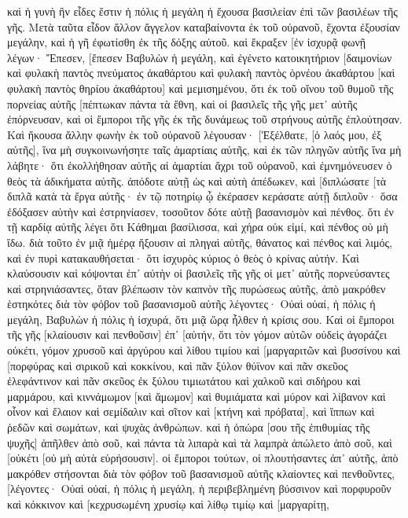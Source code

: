καὶ ἡ γυνὴ ἣν εἶδες ἔστιν ἡ πόλις ἡ μεγάλη ἡ ἔχουσα βασιλείαν ἐπὶ τῶν βασιλέων τῆς γῆς. 
Μετὰ ταῦτα εἶδον ἄλλον ἄγγελον καταβαίνοντα ἐκ τοῦ οὐρανοῦ, ἔχοντα ἐξουσίαν μεγάλην, καὶ ἡ γῆ ἐφωτίσθη ἐκ τῆς δόξης αὐτοῦ. 
καὶ ἔκραξεν [ἐν ἰσχυρᾷ φωνῇ λέγων· Ἔπεσεν, [ἔπεσεν Βαβυλὼν ἡ μεγάλη, καὶ ἐγένετο κατοικητήριον [δαιμονίων καὶ φυλακὴ παντὸς πνεύματος ἀκαθάρτου καὶ φυλακὴ παντὸς ὀρνέου ἀκαθάρτου [καὶ φυλακὴ παντὸς θηρίου ἀκαθάρτου] καὶ μεμισημένου, 
ὅτι ἐκ τοῦ οἴνου τοῦ θυμοῦ τῆς πορνείας αὐτῆς [πέπτωκαν πάντα τὰ ἔθνη, καὶ οἱ βασιλεῖς τῆς γῆς μετ᾽ αὐτῆς ἐπόρνευσαν, καὶ οἱ ἔμποροι τῆς γῆς ἐκ τῆς δυνάμεως τοῦ στρήνους αὐτῆς ἐπλούτησαν. 
Καὶ ἤκουσα ἄλλην φωνὴν ἐκ τοῦ οὐρανοῦ λέγουσαν· [Ἐξέλθατε, [ὁ λαός μου, ἐξ αὐτῆς], ἵνα μὴ συγκοινωνήσητε ταῖς ἁμαρτίαις αὐτῆς, καὶ ἐκ τῶν πληγῶν αὐτῆς ἵνα μὴ λάβητε· 
ὅτι ἐκολλήθησαν αὐτῆς αἱ ἁμαρτίαι ἄχρι τοῦ οὐρανοῦ, καὶ ἐμνημόνευσεν ὁ θεὸς τὰ ἀδικήματα αὐτῆς. 
ἀπόδοτε αὐτῇ ὡς καὶ αὐτὴ ἀπέδωκεν, καὶ [διπλώσατε [τὰ διπλᾶ κατὰ τὰ ἔργα αὐτῆς· ἐν τῷ ποτηρίῳ ᾧ ἐκέρασεν κεράσατε αὐτῇ διπλοῦν· 
ὅσα ἐδόξασεν αὑτὴν καὶ ἐστρηνίασεν, τοσοῦτον δότε αὐτῇ βασανισμὸν καὶ πένθος. ὅτι ἐν τῇ καρδίᾳ αὐτῆς λέγει ὅτι Κάθημαι βασίλισσα, καὶ χήρα οὐκ εἰμί, καὶ πένθος οὐ μὴ ἴδω. 
διὰ τοῦτο ἐν μιᾷ ἡμέρᾳ ἥξουσιν αἱ πληγαὶ αὐτῆς, θάνατος καὶ πένθος καὶ λιμός, καὶ ἐν πυρὶ κατακαυθήσεται· ὅτι ἰσχυρὸς κύριος ὁ θεὸς ὁ κρίνας αὐτήν. 
Καὶ κλαύσουσιν καὶ κόψονται ἐπ᾽ αὐτὴν οἱ βασιλεῖς τῆς γῆς οἱ μετ᾽ αὐτῆς πορνεύσαντες καὶ στρηνιάσαντες, ὅταν βλέπωσιν τὸν καπνὸν τῆς πυρώσεως αὐτῆς, 
ἀπὸ μακρόθεν ἑστηκότες διὰ τὸν φόβον τοῦ βασανισμοῦ αὐτῆς λέγοντες· Οὐαὶ οὐαί, ἡ πόλις ἡ μεγάλη, Βαβυλὼν ἡ πόλις ἡ ἰσχυρά, ὅτι μιᾷ ὥρᾳ ἦλθεν ἡ κρίσις σου. 
Καὶ οἱ ἔμποροι τῆς γῆς [κλαίουσιν καὶ πενθοῦσιν] ἐπ᾽ [αὐτήν, ὅτι τὸν γόμον αὐτῶν οὐδεὶς ἀγοράζει οὐκέτι, 
γόμον χρυσοῦ καὶ ἀργύρου καὶ λίθου τιμίου καὶ [μαργαριτῶν καὶ βυσσίνου καὶ [πορφύρας καὶ σιρικοῦ καὶ κοκκίνου, καὶ πᾶν ξύλον θύϊνον καὶ πᾶν σκεῦος ἐλεφάντινον καὶ πᾶν σκεῦος ἐκ ξύλου τιμιωτάτου καὶ χαλκοῦ καὶ σιδήρου καὶ μαρμάρου, 
καὶ κιννάμωμον [καὶ ἄμωμον] καὶ θυμιάματα καὶ μύρον καὶ λίβανον καὶ οἶνον καὶ ἔλαιον καὶ σεμίδαλιν καὶ σῖτον καὶ [κτήνη καὶ πρόβατα], καὶ ἵππων καὶ ῥεδῶν καὶ σωμάτων, καὶ ψυχὰς ἀνθρώπων. 
καὶ ἡ ὀπώρα [σου τῆς ἐπιθυμίας τῆς ψυχῆς] ἀπῆλθεν ἀπὸ σοῦ, καὶ πάντα τὰ λιπαρὰ καὶ τὰ λαμπρὰ ἀπώλετο ἀπὸ σοῦ, καὶ [οὐκέτι [οὐ μὴ αὐτὰ εὑρήσουσιν]. 
οἱ ἔμποροι τούτων, οἱ πλουτήσαντες ἀπ᾽ αὐτῆς, ἀπὸ μακρόθεν στήσονται διὰ τὸν φόβον τοῦ βασανισμοῦ αὐτῆς κλαίοντες καὶ πενθοῦντες, 
[λέγοντες· Οὐαὶ οὐαί, ἡ πόλις ἡ μεγάλη, ἡ περιβεβλημένη βύσσινον καὶ πορφυροῦν καὶ κόκκινον καὶ [κεχρυσωμένη χρυσίῳ καὶ λίθῳ τιμίῳ καὶ [μαργαρίτῃ, 
